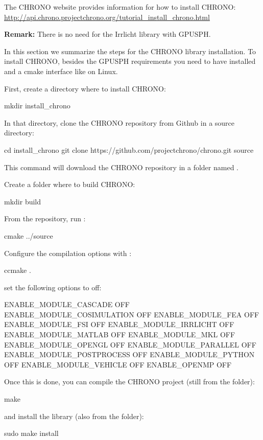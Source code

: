 \documentclass{../GPUSPHtemplate}
\begin{document}
The CHRONO website provides information for how to install CHRONO:
\url{http://api.chrono.projectchrono.org/tutorial_install_chrono.html}

\textbf{Remark:} There is no need for the Irrlicht library with GPUSPH.

In this section we summarize the steps for the CHRONO library installation.
To install CHRONO, besides the GPUSPH requirements you need to have  installed
and a cmake interface like  on Linux.

First, create a directory where to install CHRONO:
\begin{shellcode}
mkdir install_chrono
\end{shellcode}
In that directory, clone the CHRONO repository from Github in a source directory:
\begin{shellcode}
cd install_chrono
git clone https://github.com/projectchrono/chrono.git source
\end{shellcode}
This command will download the CHRONO repository in a folder named .

Create a folder where to build CHRONO:
\begin{shellcode}
mkdir build
\end{shellcode}
From the  repository, run :
\begin{shellcode}
cmake ../source
\end{shellcode}
Configure the compilation options with :
\begin{shellcode}
ccmake .
\end{shellcode}
set the following options to off:
\begin{shellcode}
 ENABLE_MODULE_CASCADE            OFF
 ENABLE_MODULE_COSIMULATION       OFF
 ENABLE_MODULE_FEA                OFF
 ENABLE_MODULE_FSI                OFF
 ENABLE_MODULE_IRRLICHT           OFF
 ENABLE_MODULE_MATLAB             OFF
 ENABLE_MODULE_MKL                OFF
 ENABLE_MODULE_OPENGL             OFF
 ENABLE_MODULE_PARALLEL           OFF
 ENABLE_MODULE_POSTPROCESS        OFF
 ENABLE_MODULE_PYTHON             OFF
 ENABLE_MODULE_VEHICLE            OFF
 ENABLE_OPENMP                    OFF
\end{shellcode}

Once this is done, you can compile the CHRONO project
(still from the  folder):
\begin{shellcode}
make
\end{shellcode}
and install the library (also from the  folder):
\begin{shellcode}
sudo make install
\end{shellcode}
\end{document}
